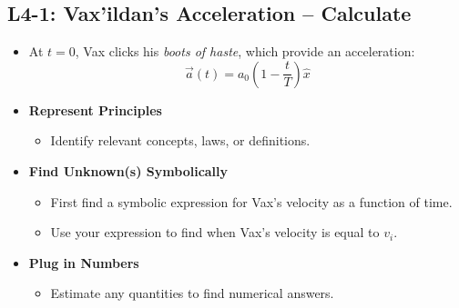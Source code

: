 \documentclass[]{article}
\begin{document}
\begin{PresentSpace}
\vspace{-10pt}
\section*{L4-1: Vax'ildan's Acceleration -- Calculate}
\vspace{-20pt}
\begin{multicols}{2}
\begin{itemize}
	\item At $t=0$, Vax clicks his \textit{boots of haste}, which provide an acceleration:
	\[
	\vec{a}(t) = a_{0}\left(1-\frac{t}{T}\right)\hat{x}
	\]
	\vspace{40pt}
	\item \textbf{Represent Principles}
	\begin{itemize}
		\item Identify relevant concepts, laws, or definitions.
	\end{itemize}
	\item \textbf{Find Unknown(s) Symbolically}
	\begin{itemize}
		\item First find a symbolic expression for Vax's velocity as a function of time.
		\item Use your expression to find when Vax's velocity is equal to $v_{i}$.
	\end{itemize}
	\item \textbf{Plug in Numbers}
	\begin{itemize}
		\item Estimate any quantities to find numerical answers.
	\end{itemize}
\end{itemize}

\end{multicols}
\end{PresentSpace}
\end{document}

